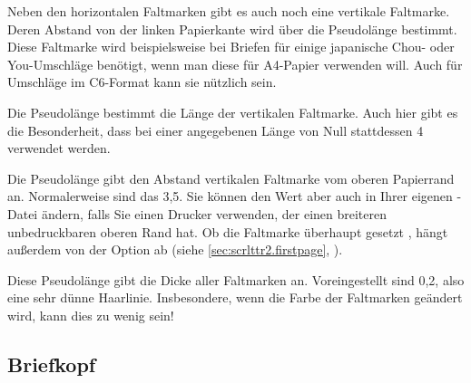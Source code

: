 \begin{Declaration}
\end{Declaration}
Neben den horizontalen Faltmarken gibt es
auch noch eine vertikale Faltmarke. Deren Abstand von der linken Papierkante
wird über die Pseudolänge  bestimmt. Diese Faltmarke
wird beispielsweise bei Briefen für einige japanische Chou- oder You-Umschläge
benötigt, wenn man diese für A4-Papier verwenden will. Auch für Umschläge im
C6-Format kann sie nützlich sein.%
\EndIndexGroup


\begin{Declaration}
\end{Declaration}
Die Pseudolänge  bestimmt
die Länge der vertikalen
Faltmarke. Auch  hier gibt es die Besonderheit, dass bei
einer angegebenen Länge von Null stattdessen 4 verwendet werden.%
\EndIndexGroup


\begin{Declaration}
\end{Declaration}
Die Pseudolänge gibt den Abstand
 vertikalen Faltmarke vom oberen Papier\-rand
an.  Normalerweise sind das 3{,}5. Sie können den
Wert aber auch in Ihrer eigenen -Datei ändern, falls Sie einen
Drucker verwenden, der einen breiteren unbedruckbaren oberen Rand hat. Ob die
Faltmarke überhaupt gesetzt , hängt außerdem
von der Option %
%
 ab (siehe
\autoref{sec:scrlttr2.firstpage},
).%
\EndIndexGroup


\begin{Declaration}
\end{Declaration}
Diese Pseudolänge gibt die Dicke aller
Faltmarken an. Voreingestellt sind 0,2, also eine sehr dünne
Haarlinie. Insbesondere, wenn die Farbe der Faltmarken
geändert wird, kann dies zu wenig sein!%
\EndIndexGroup
%
\EndIndexGroup


\subsection{Briefkopf}
\BeginIndexGroup
{}%

